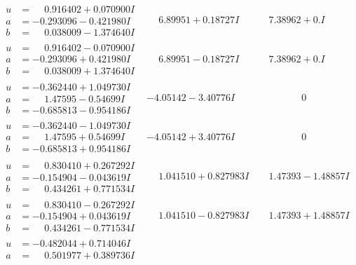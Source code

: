 \documentclass[1p]{elsarticle_modified}
\theoremstyle{definition}
\begin{document}
$$\begin{array}{c|c|c}
\begin{aligned}
u &= \phantom{-}0.916402 + 0.070900 I \\
a &= -0.293096 - 0.421980 I \\
b &= \phantom{-}0.038009 - 1.374640 I\end{aligned}
 & \phantom{-}6.89951 + 0.18727 I & \phantom{-}7.38962 + 0. I\phantom{ +0.000000I} \\ \hline\begin{aligned}
u &= \phantom{-}0.916402 - 0.070900 I \\
a &= -0.293096 + 0.421980 I \\
b &= \phantom{-}0.038009 + 1.374640 I\end{aligned}
 & \phantom{-}6.89951 - 0.18727 I & \phantom{-}7.38962 + 0. I\phantom{ +0.000000I} \\ \hline\begin{aligned}
u &= -0.362440 + 1.049730 I \\
a &= \phantom{-}1.47595 - 0.54699 I \\
b &= -0.685813 - 0.954186 I\end{aligned}
 & -4.05142 - 3.40776 I & \phantom{-0.000000 } 0 \\ \hline\begin{aligned}
u &= -0.362440 - 1.049730 I \\
a &= \phantom{-}1.47595 + 0.54699 I \\
b &= -0.685813 + 0.954186 I\end{aligned}
 & -4.05142 + 3.40776 I & \phantom{-0.000000 } 0 \\ \hline\begin{aligned}
u &= \phantom{-}0.830410 + 0.267292 I \\
a &= -0.154904 - 0.043619 I \\
b &= \phantom{-}0.434261 + 0.771534 I\end{aligned}
 & \phantom{-}1.041510 + 0.827983 I & \phantom{-}1.47393 - 1.48857 I \\ \hline\begin{aligned}
u &= \phantom{-}0.830410 - 0.267292 I \\
a &= -0.154904 + 0.043619 I \\
b &= \phantom{-}0.434261 - 0.771534 I\end{aligned}
 & \phantom{-}1.041510 - 0.827983 I & \phantom{-}1.47393 + 1.48857 I \\ \hline\begin{aligned}
u &= -0.482044 + 0.714046 I \\
a &= \phantom{-}0.501977 + 0.389736 I \\

\end{aligned}
\end{array}$$
\end{document}
